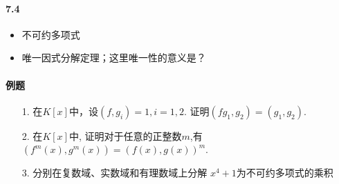 \vspace{0.5cm}
\paragraph{7.4}
\begin{itemize}
  \item 不可约多项式
  \item 唯一因式分解定理；这里唯一性的意义是？
\end{itemize}
\paragraph{例题}
\begin{itemize}
  \item[1.] 在$K[x]$中，设$(f,g_i)=1,i=1,2$. 证明$(fg_1,g_2)=(g_1,g_2)$.
  \item[2.] 在$K[x]$中, 证明对于任意的正整数$m$,有$(f^m(x), g^m(x)) = (f(x),g(x))^m$.
  \item[3.] 分别在复数域、实数域和有理数域上分解 $x^4+1$为不可约多项式的乘积 
\end{itemize}